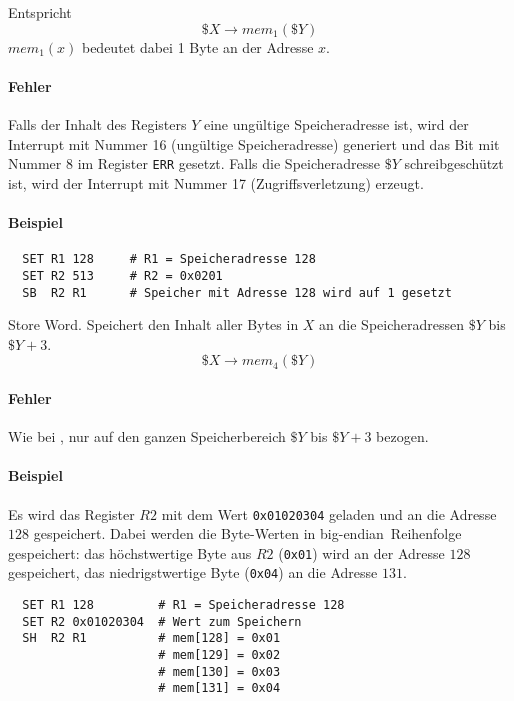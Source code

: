 Entspricht
\[
    \$X \to mem_{1} (\$Y)
\]
$mem_{1}(x)$ bedeutet dabei 1 Byte an der Adresse $x$.

\paragraph{Fehler}
Falls der Inhalt des Registers $Y$ eine ungültige Speicheradresse ist, wird der
Interrupt mit Nummer 16 (ungültige Speicheradresse) generiert und das Bit mit
Nummer 8 im Register \texttt{ERR} gesetzt. Falls die Speicheradresse $\$Y$
schreibgeschützt ist, wird der Interrupt mit Nummer 17 (Zugriffsverletzung)
erzeugt.

\paragraph{Beispiel}
\begin{lstlisting}
  SET R1 128     # R1 = Speicheradresse 128
  SET R2 513     # R2 = 0x0201
  SB  R2 R1      # Speicher mit Adresse 128 wird auf 1 gesetzt
\end{lstlisting}




\glqq Store Word\grqq.
Speichert den Inhalt aller Bytes in $X$ an die Speicheradressen $\$Y$ bis 
$\$Y + 3$.
\[
    \$X \to mem_{4}(\$Y)
\]

\paragraph{Fehler}
Wie bei , nur auf den ganzen Speicherbereich $\$Y$ bis $\$Y + 3$
bezogen.


\paragraph{Beispiel}
Es wird das Register $R2$ mit dem Wert \texttt{0x01020304} geladen und an die
Adresse $128$ gespeichert. Dabei werden die Byte-Werten in 
\glqq big-endian\grqq\ Reihenfolge gespeichert: das höchstwertige Byte aus $R2$
(\texttt{0x01}) wird an der Adresse $128$ gespeichert, das niedrigstwertige
Byte (\texttt{0x04}) an die Adresse $131$.

\begin{lstlisting}
  SET R1 128         # R1 = Speicheradresse 128
  SET R2 0x01020304  # Wert zum Speichern
  SH  R2 R1          # mem[128] = 0x01
                     # mem[129] = 0x02
                     # mem[130] = 0x03
                     # mem[131] = 0x04
\end{lstlisting}





